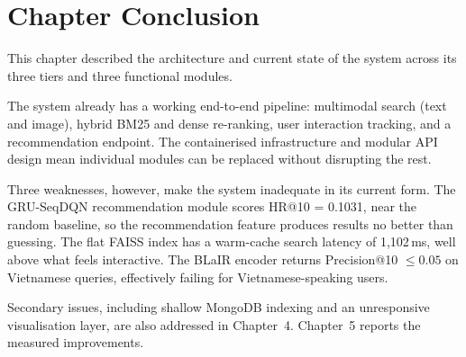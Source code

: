 \section{Chapter Conclusion}

This chapter described the architecture and current state of the system across its three tiers and three functional modules.

The system already has a working end-to-end pipeline: multimodal search (text and image), hybrid BM25 and dense re-ranking, user interaction tracking, and a recommendation endpoint. The containerised infrastructure and modular API design mean individual modules can be replaced without disrupting the rest.

Three weaknesses, however, make the system inadequate in its current form. The GRU-SeqDQN recommendation module scores HR@10 = 0.1031, near the random baseline, so the recommendation feature produces results no better than guessing. The flat FAISS index has a warm-cache search latency of 1{,}102\,ms, well above what feels interactive. The BLaIR encoder returns Precision@10 $\leq 0.05$ on Vietnamese queries, effectively failing for Vietnamese-speaking users.

Secondary issues, including shallow MongoDB indexing and an unresponsive visualisation layer, are also addressed in Chapter~4. Chapter~5 reports the measured improvements.

